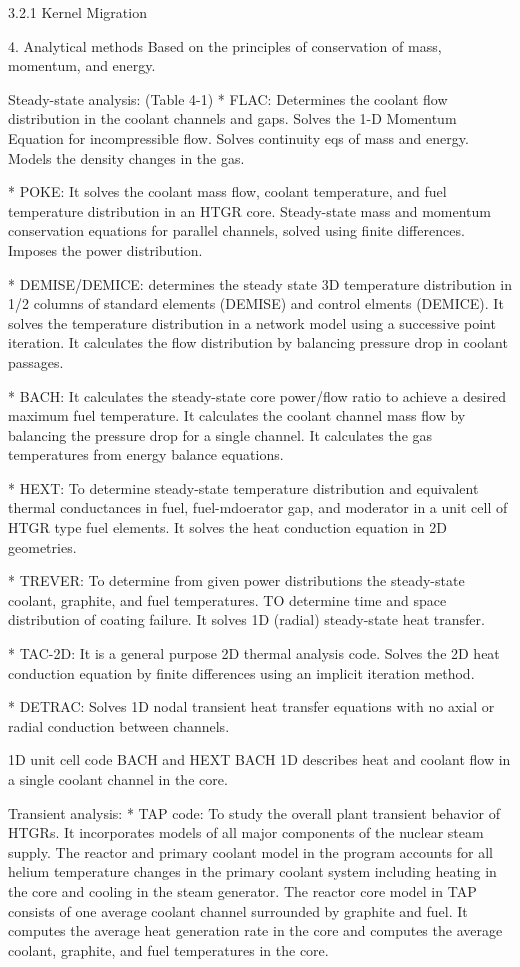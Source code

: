 3.2.1 Kernel Migration

4. Analytical methods
Based on the principles of conservation of mass, momentum, and energy.

Steady-state analysis: (Table 4-1)
* FLAC:
Determines the coolant flow distribution in the coolant channels and gaps.
Solves the 1-D Momentum Equation for incompressible flow.
Solves continuity eqs of mass and energy. 
Models the density changes in the gas.

* POKE:
It solves the coolant mass flow, coolant temperature, and fuel temperature distribution in an HTGR core.
Steady-state mass and momentum conservation equations for parallel channels, solved using finite differences.
Imposes the power distribution.

* DEMISE/DEMICE: determines the steady state 3D temperature distribution in 1/2 columns of standard elements (DEMISE) and control elments (DEMICE).
It solves the temperature distribution in a network model using a successive point iteration.
It calculates the flow distribution by balancing pressure drop in coolant passages.

* BACH:
It calculates the steady-state core power/flow ratio to achieve a desired maximum fuel temperature.
It calculates the coolant channel mass flow by balancing the pressure drop for a single channel.
It calculates the gas temperatures from energy balance equations.

* HEXT:
To determine steady-state temperature distribution and equivalent thermal conductances in fuel, fuel-mdoerator gap, and moderator in a unit cell of HTGR type fuel elements.
It solves the heat conduction equation in 2D geometries.

* TREVER:
To determine from given power distributions the steady-state coolant, graphite, and fuel temperatures.
TO determine time and space distribution of coating failure.
It solves 1D (radial) steady-state heat transfer.

* TAC-2D:
It is a general purpose 2D thermal analysis code.
Solves the 2D heat conduction equation by finite differences using an implicit iteration method.

* DETRAC:
Solves 1D nodal transient heat transfer equations with no axial or radial conduction between channels.

1D unit cell code BACH and HEXT
BACH 1D describes heat and coolant flow in a single coolant channel in the core.

Transient analysis:
* TAP code:
To study the overall plant transient behavior of HTGRs.
It incorporates models of all major components of the nuclear steam supply.
The reactor and primary coolant model in the program accounts for all helium temperature changes in the primary coolant system including heating in the core and cooling in the steam generator.
The reactor core model in TAP consists of one average coolant channel surrounded by graphite and fuel.
It computes the average heat generation rate in the core and computes the average coolant, graphite, and fuel temperatures in the core.

